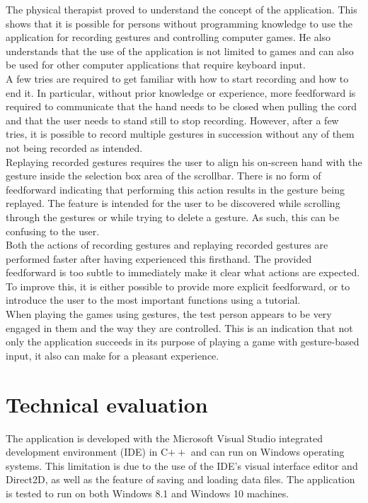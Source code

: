The physical therapist proved to understand the concept of the application. This shows that it is possible for persons without programming knowledge to use the application for recording gestures and controlling computer games. He also understands that the use of the application is not limited to games and can also be used for other computer applications that require keyboard input.\\

A few tries are required to get familiar with how to start recording and how to end it. In particular, without prior knowledge or experience, more feedforward is required to communicate that the hand needs to be closed when pulling the cord and that the user needs to stand still to stop recording. However, after a few tries, it is possible to record multiple gestures in succession without any of them not being recorded as intended.\\

Replaying recorded gestures requires the user to align his on-screen hand with the gesture inside the selection box area of the scrollbar. There is no form of feedforward indicating that performing this action results in the gesture being replayed. The feature is intended for the user to be discovered while scrolling through the gestures or while trying to delete a gesture. As such, this can be confusing to the user.\\

Both the actions of recording gestures and replaying recorded gestures are performed faster after having experienced this firsthand. The provided feedforward is too subtle to immediately make it clear what actions are expected. To improve this, it is either possible to provide more explicit feedforward, or to introduce the user to the most important functions using a tutorial.\\

When playing the games using gestures, the test person appears to be very engaged in them and the way they are controlled. This is an indication that not only the application succeeds in its purpose of playing a game with gesture-based input, it also can make for a pleasant experience.


\section{Technical evaluation}

The application is developed with the Microsoft Visual Studio integrated development environment (IDE) in C$++$ and can run on Windows operating systems. This limitation is due to the use of the IDE's visual interface editor and Direct2D, as well as the feature of saving and loading data files. The application is tested to run on both Windows 8.1 and Windows 10 machines.\\

